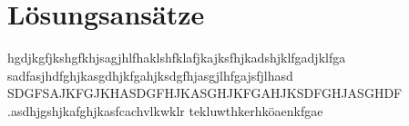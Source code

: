 \chapter{Lösungsansätze}
hgdjkgfjkshgfkhjsagjhlfhaklshfklafjkajksfhjkadshjklfgadjklfga
sadfasjhdfghjkasgdhjkfgahjksdgfhjasgjlhfgajsfjlhasd
SDGFSAJKFGJKHASDGFHJKASGHJKFGAHJKSDFGHJASGHDF
.asdhjgshjkafghjkasfcachvlkwklr tekluwthkerhköaenkfgae
